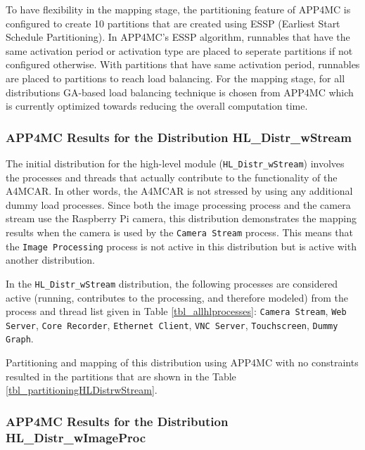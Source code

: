 To have flexibility in the mapping stage, the partitioning feature of APP4MC is configured to create 10 partitions that are created using ESSP (Earliest Start Schedule Partitioning). In APP4MC's ESSP algorithm, runnables that have the same activation period or activation type are placed to seperate partitions if not configured otherwise. With partitions that have same activation period, runnables are placed to partitions to reach load balancing. For the mapping stage, for all distributions GA-based load balancing technique is chosen from APP4MC which is currently optimized towards reducing the overall computation time.

\allhlprocesses

\subsubsection{APP4MC Results for the Distribution HL{\_}Distr{\_}wStream}

The initial distribution for the high-level module (\texttt{HL{\_}Distr{\_}wStream}) involves the processes and threads that actually contribute to the functionality of the A4MCAR. In other words, the A4MCAR is not stressed by using any additional dummy load processes. Since both the image processing process and the camera stream use the Raspberry Pi camera, this distribution demonstrates the mapping results when the camera is used by the \texttt{Camera Stream} process. This means that the \texttt{Image Processing} process is not active in this distribution but is active with another distribution. 

In the \texttt{HL{\_}Distr{\_}wStream} distribution, the following processes are considered active (running, contributes to the processing, and therefore modeled) from the process and thread list given in Table \ref{tbl_allhlprocesses}: \texttt{Camera Stream}, \texttt{Web Server}, \texttt{Core Recorder}, \texttt{Ethernet Client}, \texttt{VNC Server}, \texttt{Touchscreen}, \texttt{Dummy Graph}.

Partitioning and mapping of this distribution using APP4MC with no constraints resulted in the partitions that are shown in the Table \ref{tbl_partitioningHLDistrwStream}.

\partitioningHLDistrwStream

\subsubsection{APP4MC Results for the Distribution HL{\_}Distr{\_}wImageProc}

